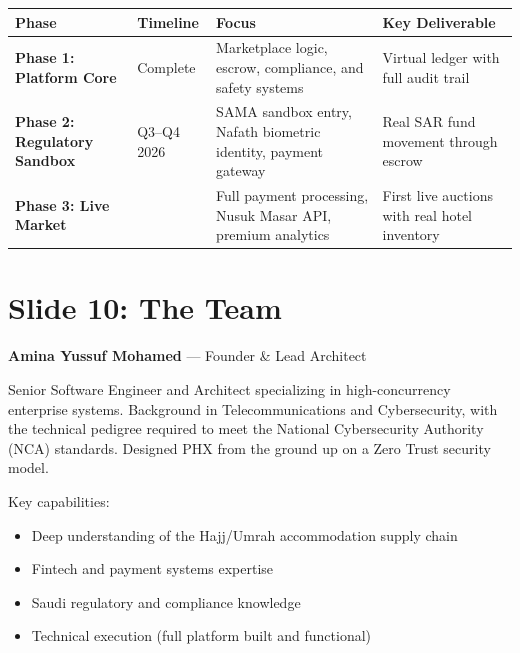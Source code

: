 \documentclass[11pt,a4paper]{article}
\providecommand{\tightlist}{%
  \setlength{\itemsep}{0pt}\setlength{\parskip}{0pt}}
\begin{document}
\begin{center}
\begin{tabular}{|>{\raggedright\arraybackslash}p{2.5cm}|>{\raggedright\arraybackslash}p{2cm}|>{\raggedright\arraybackslash}p{4.5cm}|>{\raggedright\arraybackslash}p{4.5cm}|}
\hline
\rowcolor{headergray}
\textbf{Phase} & \textbf{Timeline} & \textbf{Focus} & \textbf{Key Deliverable} \\
\hline
\textbf{Phase 1: Platform Core} & Complete & Marketplace logic, escrow, compliance, and safety systems & Virtual ledger with full audit trail \\
\hline
\textbf{Phase 2: Regulatory Sandbox} & Q3--Q4 2026 & SAMA sandbox entry, Nafath biometric identity, payment gateway & Real SAR fund movement through escrow \\
\hline
\textbf{Phase 3: Live Market} & 2027 & Full payment processing, Nusuk Masar API, premium analytics & First live auctions with real hotel inventory \\
\hline
\end{tabular}
\end{center}

\newpage

\section*{Slide 10: The Team}

\textbf{Amina Yussuf Mohamed} --- Founder \& Lead Architect

\vspace{0.3cm}

Senior Software Engineer and Architect specializing in high-concurrency enterprise systems. Background in Telecommunications and Cybersecurity, with the technical pedigree required to meet the National Cybersecurity Authority (NCA) standards. Designed PHX from the ground up on a Zero Trust security model.

\vspace{0.5cm}

Key capabilities:
\begin{itemize}
\tightlist
\item Deep understanding of the Hajj/Umrah accommodation supply chain
\item Fintech and payment systems expertise
\item Saudi regulatory and compliance knowledge
\item Technical execution (full platform built and functional)
\end{itemize}
\end{document}
